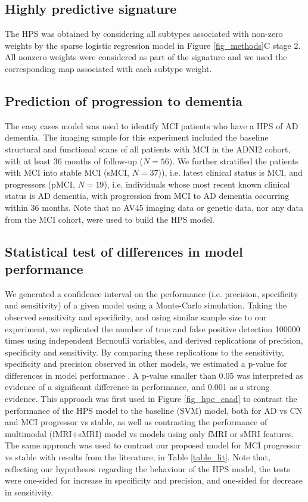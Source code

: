 \documentclass[authoryear]{elsarticle}
\begin{document}
\subsection*{Highly predictive signature}
The HPS was obtained by considering all subtypes associated with non-zero weights by the sparse logistic regression model in Figure \ref{fig_methods}C stage 2. All nonzero weights were considered as part of the signature and we used the corresponding map associated with each subtype weight.
\subsection*{Prediction of progression to dementia}
The easy cases model was used to identify MCI patients who have a HPS of AD dementia. The imaging sample for this experiment included the baseline structural and functional scans of all patients with MCI in the ADNI2 cohort, with at least 36 months of follow-up ($N=56$). We further stratified the patients with MCI into stable MCI (sMCI, $N=37$)), i.e. latest clinical status is MCI, and progressors (pMCI, $N=19$), i.e. individuals whose most recent known clinical status is AD dementia, with progression from MCI to AD dementia occurring within 36 months. Note that no AV45 imaging data or genetic data, nor any data from the MCI cohort, were used to build the HPS model.
\subsection*{Statistical test of differences in model performance}
We generated a confidence interval on the performance (i.e. precision, specificity and sensitivity) of a given model using a Monte-Carlo simulation. Taking the observed sensitivity and specificity, and using similar sample size to our experiment, we replicated the number of true and false positive detection 100000 times using independent Bernoulli variables, and derived replications of precision, specificity and sensitivity. By comparing these replications to the sensitivity, specificity and precision observed in other models, we estimated a p-value for differences in model performance \citep{Phipson2010}. A p-value smaller than 0.05 was interpreted as evidence of a significant difference in performance,  and 0.001 as a strong evidence. This approach was first used in Figure \ref{fig_hpc_cnad} to contrast the performance of the HPS model to the baseline (SVM) model, both for AD vs CN and MCI progressor vs stable, as well as contrasting the performance of multimodal (fMRI+sMRI) model vs models using only fMRI or sMRI features. The same approach was used to contrast our proposed model for MCI progressor vs stable with results from the literature, in Table \ref{table_lit}. Note that, reflecting our hypotheses regarding the behaviour of the HPS model, the tests were one-sided for increase in specificity and precision, and one-sided for decrease in sensitivity. 
\end{document}
